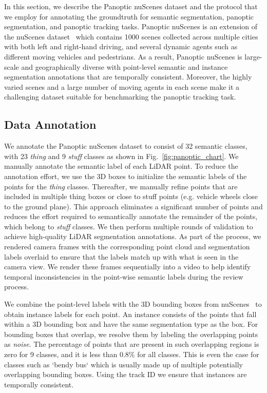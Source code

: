 \documentclass[letterpaper, 10 pt, journal, twoside]{IEEEtran}
\newcommand{\figref}[1]{Fig.~\ref{#1}}
\begin{document}
In this section, we describe the Panoptic nuScenes dataset and the protocol that we employ for annotating the groundtruth for semantic segmentation, panoptic segmentation, and panoptic tracking tasks. Panoptic nuScenes is an extension of the nuScenes dataset~\cite{caesar2020nuscenes} which contains 1000 scenes collected across multiple cities with both left and right-hand driving, and several dynamic agents such as different moving vehicles and pedestrians. As a result, Panoptic nuScenes is large-scale and geographically diverse with point-level semantic and instance segmentation annotations that are temporally consistent. Moreover, the highly varied scenes and a large number of moving agents in each scene make it a challenging dataset suitable for benchmarking the panoptic tracking task.

\vspace{-2mm}
\subsection{Data Annotation}
\label{sec:annotation_protocol}
We annotate the Panoptic nuScenes dataset to consist of 32 semantic classes, with 23 \emph{thing} and 9 \emph{stuff} classes as shown in \figref{fig:panoptic_chart}. We manually annotate the semantic label of each LiDAR point. To reduce the annotation effort, we use the 3D boxes to initialize the semantic labels of the points for the \emph{thing} classes. Thereafter, we manually refine points that are included in multiple thing boxes or close to stuff points (e.g. vehicle wheels close to the ground plane). This approach eliminates a significant number of points and reduces the effort required to semantically annotate the remainder of the points, which belong to \emph{stuff} classes. 
We then perform multiple rounds of validation to achieve high-quality LiDAR segmentation annotations. As part of the process, we rendered camera frames with the corresponding point cloud and segmentation labels overlaid to ensure that the labels match up with what is seen in the camera view. We render these frames sequentially into a video to help identify temporal inconsistencies in the point-wise semantic labels during the review process.

We combine the point-level labels with the 3D bounding boxes from nuScenes~\cite{caesar2020nuscenes} to obtain instance labels for each point. An instance consists of the points that fall within a 3D bounding box and have the same segmentation type as the box. For bounding boxes that overlap, we resolve them by labeling the overlapping points as \emph{noise}. The percentage of points that are present in such overlapping regions is zero for 9 classes, and it is less than $0.8\%$ for all classes. This is even the case for classes such as `bendy bus` which is usually made up of multiple potentially overlapping bounding boxes. 
Using the track ID we ensure that instances are temporally consistent.
\end{document}
